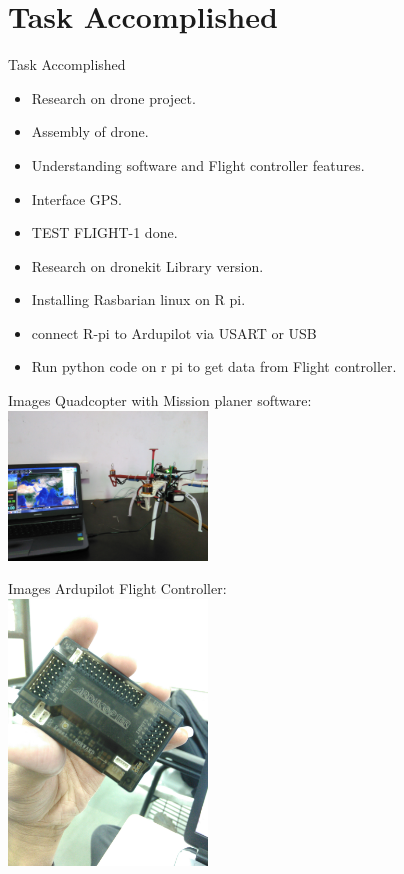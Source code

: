 \documentclass[10pt, a4paper]{beamer}
\begin{document}
\section{Task Accomplished}
\begin{frame}{Task Accomplished}
	\begin{itemize}
	    \item Research on drone project.
		\item Assembly of drone.
		\item Understanding software and Flight controller features.
		\item Interface GPS.
		\item TEST FLIGHT-1 done.
		\item Research on dronekit Library version.
		\item Installing Rasbarian linux on R pi.
		\item connect R-pi to Ardupilot via USART or USB
		\item Run python code on r pi to get data from Flight controller.
	\end{itemize}
\end{frame}

\begin{frame}{Images}
	Quadcopter with Mission planer software: \\
	\centering
		\includegraphics[width =200px]{qd1}

\end{frame}



\begin{frame}{Images}
	Ardupilot Flight Controller: \\
	    \centering
		\includegraphics[width =200px]{fc}
\end{frame}
\end{document}

